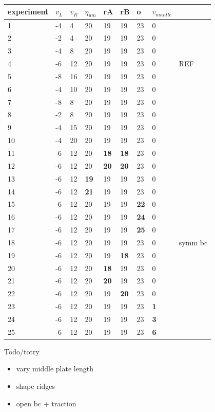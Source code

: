 \begin{tabular}{lllllllll}
\hline
experiment & $v_L$ & $v_R$ & $\eta_{um}$ &rA &rB &o & $v_{mantle}$\\ 
\hline
\hline
1 & -4 &  4& 20&19&19&23&0\\
2 & -2 &  4& 20&19&19&23&0\\
3 & -4 &  8& 20&19&19&23&0\\
4 & -6 & 12& 20&19&19&23&0 & REF\\
5 & -8 & 16& 20&19&19&23&0\\
6 & -4 & 10& 20&19&19&23&0\\
7 & -8 &  8& 20&19&19&23&0\\
8 & -2 &  8& 20&19&19&23&0\\
9 & -4 & 15& 20&19&19&23&0\\
10& -4 & 20& 20&19&19&23&0\\
11& -6 & 12& 20       & {\bf 18} &  {\bf 18} & 23&0 & \\ 
12& -6 & 12& 20       & {\bf 20} &  {\bf 20} & 23&0 & \\ 
13& -6 & 12& {\bf 19} & 19       & 19        & 23&0\\
14& -6 & 12& {\bf 21} & 19       & 19        & 23&0\\
15& -6 & 12& 20       & 19       & 19        & {\bf 22}&0\\
16& -6 & 12& 20       & 19       & 19        & {\bf 24}&0\\
17& -6 & 12& 20       & 19       & 19        & {\bf 25}&0\\
18& -6 & 12& 20       & 19       & 19        & 23&0 & symm bc\\
19& -6 & 12& 20       & 19       & {\bf 18}  & 23&0&\\
20& -6 & 12& 20       & {\bf 18} & 19        & 23&0&\\
21& -6 & 12& 20       & {\bf 20} & 19        & 23&0&\\
22& -6 & 12& 20       &  19      & {\bf 20}  & 23&0&\\
23& -6 & 12& 20&19&19&23& {\bf 1} & \\
24& -6 & 12& 20&19&19&23& {\bf 3} & \\
25& -6 & 12& 20&19&19&23& {\bf 6} & \\
\hline
\end{tabular}




Todo/totry
\begin{itemize}
\item vary middle plate length
\item shape ridges
\item open bc + traction
\end{itemize}

